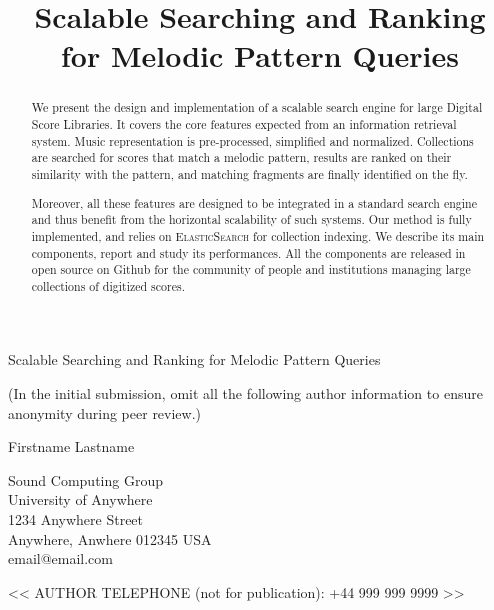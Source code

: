 \documentclass[letterpaper, 11pt]{article}
\def\elasticsearch/{\textsc{ElasticSearch}}
\begin{document}
\title{Scalable Searching and Ranking\\  for Melodic Pattern Queries}

{\cmjTitle Scalable Searching and Ranking for Melodic Pattern Queries}
\vspace*{24pt}

(In the initial submission, omit all the following author information to ensure anonymity during peer review.)

{\cmjAuthor Firstname Lastname}
\newline
\begin{cmjAuthorAddress}
    Sound Computing Group\\
    University of Anywhere\\
    1234 Anywhere Street\\
    Anywhere, Anwhere 012345 USA\\
    email@email.com
\end{cmjAuthorAddress}

\vspace*{24pt}
{\cmjAuthorPhone << AUTHOR TELEPHONE (not for publication): +44 999 999 9999 >>}
\vspace*{24pt}


%
\maketitle

%
\begin{abstract}
We present the design and implementation of a scalable search engine for large Digital Score 
Libraries. It covers the core features expected from an information retrieval system. 
Music representation is pre-processed, simplified and normalized.
Collections are searched for scores that match
a melodic pattern, results are ranked on their similarity with the pattern, and matching fragments 
are finally identified on the fly. 

Moreover, all these features are designed to be integrated in a standard
search engine and thus benefit from the horizontal scalability
of such systems. Our method is fully implemented, and relies
on \elasticsearch/ for collection indexing. We describe its main components,
report and study its performances. All the components are released in open source on Github
for the community of people and institutions managing large collections of digitized scores.
\end{abstract}
\end{document}
